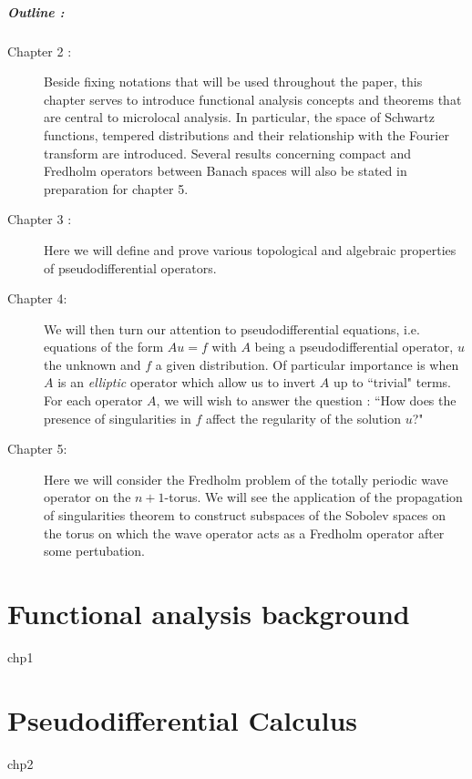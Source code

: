 \documentclass[12pt, twoside]{book}
\begin{document}
\paragraph{\Large Outline : }\hfill 
\begin{description}
    \item[Chapter 2 :] Beside fixing notations that will be used throughout the paper, this chapter serves to introduce functional analysis concepts and theorems that are central to microlocal analysis. In particular, the space of Schwartz functions, tempered distributions and their relationship with the Fourier transform are introduced. Several results concerning compact and Fredholm operators between Banach spaces will also be stated in preparation for chapter 5. 
    
    \item[Chapter 3 :] Here we will define and prove various topological and algebraic properties of pseudodifferential operators. 
    
    \item[Chapter 4: ] We will then turn our attention to pseudodifferential equations, i.e. equations of the form $Au = f$ with $A$ being a pseudodifferential operator, $u$ the unknown and $f$ a given distribution. Of particular importance is when $A$ is an \textit{elliptic} operator which allow us to invert $A$ up to ``trivial" terms. For each operator $A$, we will wish to answer the question : ``How does the presence of singularities in $f$ affect the regularity of the solution $u$?" 
    
    \item[Chapter 5: ] Here we will consider the Fredholm problem of the totally periodic wave operator on the $n + 1$-torus. We will see the application of the propagation of singularities theorem to construct subspaces of the Sobolev spaces on the torus on which the wave operator acts as a Fredholm operator after some pertubation. 
    
\end{description}


\chapter{Functional analysis background}
{chp1}

\chapter{Pseudodifferential Calculus}
{chp2}
\end{document}
